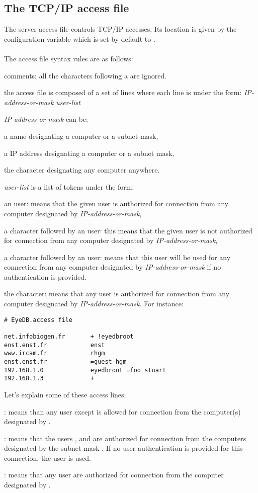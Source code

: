 \subsection{The TCP/IP access file}
\newcommand{\tcpip}{\emph{IP-address-or-mask}}
The server access file controls TCP/IP accesses. Its location
is given by the configuration variable  which
is set by default to .
\\
\\
The access file syntax rules are as follows:
\bi
\item comments: all the characters following a \ttv{\#} are ignored.
\item the access file is composed of a set of lines where each
line is under the form:
{\tcpip } \emph{user-list}
\item {\tcpip } can be:
\bi
\item a name designating a computer or a subnet mask,
\item a IP address designating a computer or a subnet mask,
\item the \ttv{+} character designating any computer anywhere.
\ei
\item \emph{user-list} is a list of tokens under the form:
\bi
\item an \eyedb user: means that the given user is authorized for
connection from any computer designated by {\tcpip},
\item a \ttv{!} character followed by an \eyedb user: this
means that the given user is not authorized for
connection from any computer designated by {\tcpip},
\item a \ttv{=} character followed by an \eyedb user: means
that this user will be used for any connection from any computer designated
by {\tcpip } if no authentication is provided.
\item the \ttv{+} character: means that any \eyedb user
is authorized for
connection from any computer designated by {\tcpip}.
\ei
\ei
For instance:
\verbsize\begin{verbatim}
# EyeDB.access file

net.infobiogen.fr       + !eyedbroot
enst.enst.fr            enst
www.ircam.fr            rhgm
enst.enst.fr            =guest hgm
192.168.1.0             eyedbroot =foo stuart
192.168.1.3             +
\end{verbatim}\normalsize
Let's explain some of these access lines:
\bi
\item {}: means than any \eyedb user except
 is allowed for connection from the computer(s) designated
by .
\item {\verbsize{}}: means that the \eyedb users
,  and  are authorized for connection
from the computers designated by the subnet mask . If
no user authentication is provided for this connection, the user 
is used.
\item {}: means that any \eyedb user are authorized
for connection from the computer designated by 
.
\ei
